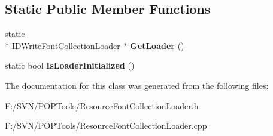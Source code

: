 \subsection*{Static Public Member Functions}
\begin{DoxyCompactItemize}
\item 
\hypertarget{class_resource_font_collection_loader_a6b7a62a995980bd155b45500f56cf9b4}{static \\*
I\-D\-Write\-Font\-Collection\-Loader $\ast$ {\bfseries Get\-Loader} ()}\label{class_resource_font_collection_loader_a6b7a62a995980bd155b45500f56cf9b4}

\item 
\hypertarget{class_resource_font_collection_loader_a664fd8936c247ff41c015a338b4e72ef}{static bool {\bfseries Is\-Loader\-Initialized} ()}\label{class_resource_font_collection_loader_a664fd8936c247ff41c015a338b4e72ef}

\end{DoxyCompactItemize}


The documentation for this class was generated from the following files\-:\begin{DoxyCompactItemize}
\item 
F\-:/\-S\-V\-N/\-P\-O\-P\-Tools/Resource\-Font\-Collection\-Loader.\-h\item 
F\-:/\-S\-V\-N/\-P\-O\-P\-Tools/Resource\-Font\-Collection\-Loader.\-cpp\end{DoxyCompactItemize}
